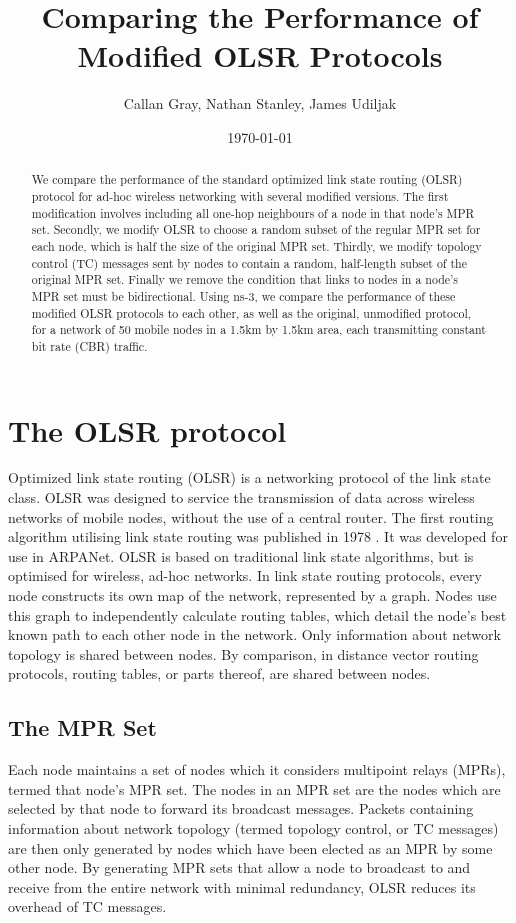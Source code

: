 \documentclass[12pt,a4paper]{article}
\title{Comparing the Performance of Modified OLSR Protocols}
\author{Callan Gray, Nathan Stanley, James Udiljak}
\date{\today}
\begin{document}
\maketitle

\begin{abstract}
We compare the performance of the standard optimized link state routing (OLSR) protocol for ad-hoc wireless networking with several modified versions. The first modification involves including all one-hop neighbours of a node in that node's MPR set. Secondly, we modify OLSR to choose a random subset of the regular MPR set for each node, which is half the size of the original MPR set. Thirdly, we modify topology control (TC) messages sent by nodes to contain a random, half-length subset of the original MPR set. Finally we remove the condition that links to nodes in a node's MPR set must be bidirectional. Using ns-3, we compare the performance of these modified OLSR protocols to each other, as well as the original, unmodified protocol, for a network of 50 mobile nodes in a 1.5km by 1.5km area, each transmitting constant bit rate (CBR) traffic.
\end{abstract}

\section{The OLSR protocol}
Optimized link state routing (OLSR) is a networking protocol of the link state class. OLSR was designed to service the transmission of data across wireless networks of mobile nodes, without the use of a central router\cite{clausen2003optimized}. The first routing algorithm utilising link state routing was published in 1978 \cite{mcquillan1978arpanet}. It was developed for use in ARPANet. OLSR is based on traditional link state algorithms, but is optimised for wireless, ad-hoc networks. In link state routing protocols, every node constructs its own map of the network, represented by a graph. Nodes use this graph to independently calculate routing tables, which detail the node's best known path to each other node in the network. Only information about network topology is shared between nodes. By comparison, in distance vector routing protocols, routing tables, or parts thereof, are shared between nodes.

\subsection{The MPR Set}
Each node maintains a set of nodes which it considers multipoint relays (MPRs), termed that node's MPR set. The nodes in an MPR set are the nodes which are selected by that node to forward its broadcast messages. Packets containing information about network topology (termed topology control, or TC messages) are then only generated by nodes which have been elected as an MPR by some other node. By generating MPR sets that allow a node to broadcast to and receive from the entire network with minimal redundancy, OLSR reduces its overhead of TC messages.
\end{document}
